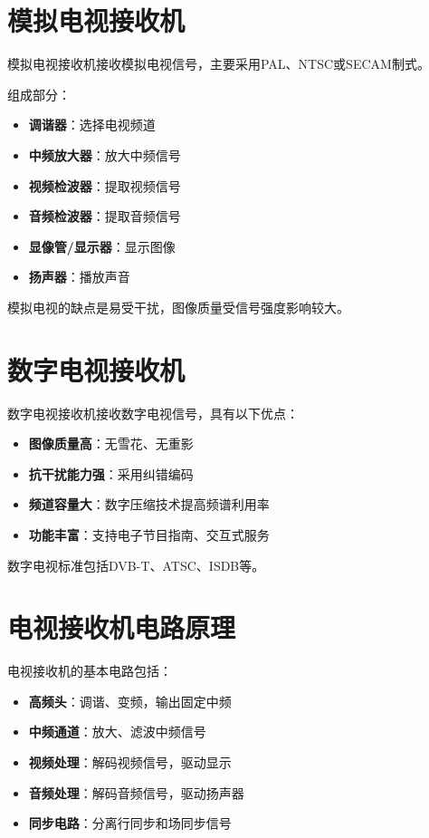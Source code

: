 \section{模拟电视接收机}
\label{sec:analog_tv_receiver}

模拟电视接收机接收模拟电视信号，主要采用PAL、NTSC或SECAM制式。

组成部分：
\begin{itemize}
    \item \textbf{调谐器}：选择电视频道
    \item \textbf{中频放大器}：放大中频信号
    \item \textbf{视频检波器}：提取视频信号
    \item \textbf{音频检波器}：提取音频信号
    \item \textbf{显像管/显示器}：显示图像
    \item \textbf{扬声器}：播放声音
\end{itemize}

模拟电视的缺点是易受干扰，图像质量受信号强度影响较大。

\section{数字电视接收机}
\label{sec:digital_tv_receiver}

数字电视接收机接收数字电视信号，具有以下优点：

\begin{itemize}
    \item \textbf{图像质量高}：无雪花、无重影
    \item \textbf{抗干扰能力强}：采用纠错编码
    \item \textbf{频道容量大}：数字压缩技术提高频谱利用率
    \item \textbf{功能丰富}：支持电子节目指南、交互式服务
\end{itemize}

数字电视标准包括DVB-T、ATSC、ISDB等。

\section{电视接收机电路原理}
\label{sec:tv_circuit_principle}

电视接收机的基本电路包括：

\begin{itemize}
    \item \textbf{高频头}：调谐、变频，输出固定中频
    \item \textbf{中频通道}：放大、滤波中频信号
    \item \textbf{视频处理}：解码视频信号，驱动显示
    \item \textbf{音频处理}：解码音频信号，驱动扬声器
    \item \textbf{同步电路}：分离行同步和场同步信号
\end{itemize}

